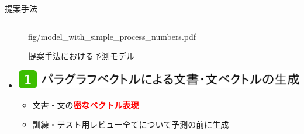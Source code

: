 \documentclass[unicode,10pt]{beamer}
\newlength{\mycolumnwidth}
\newlength{\mytitlefigureheight}
\newcommand{\arrow}{\textcolor{ttiblue}{\textbf{→}}\hspace{1ex}}
\newcommand{\itemtitle}[1]{\textbf{#1}\\}
\newcommand{\fire}[1]{\textcolor{red}{\textbf{#1}}}
\begin{document}
\begin{frame}[t]
\begin{block}{提案手法}
\begin{columns}[onlytextwidth,t]
\begin{column}{\mycolumnwidth}
\begin{figure}
                        {fig/model_with_simple_process_numbers.pdf}
        \caption*{提案手法における予測モデル}
      \end{figure}
      \vspace{-0.75em} %
      \begin{itemize}
        \item \itemtitle{\includegraphics[height=\mytitlefigureheight]
                                         {fig/poster_model_title_1.pdf}}
          \begin{itemize}
            \item 文書・文の\fire{密なベクトル表現}
            \item 訓練・テスト用レビュー全てについて予測の前に生成
          \end{itemize}
      \end{itemize}
    \end{column}


\end{columns}
\end{block}
\end{frame}
\end{document}
